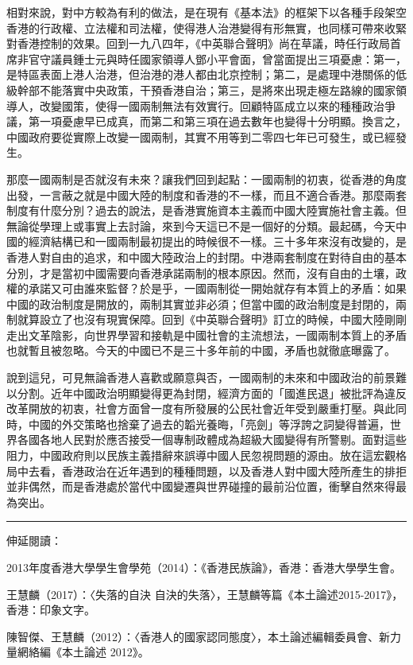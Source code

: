 相對來說，對中方較為有利的做法，是在現有《基本法》的框架下以各種手段架空香港的行政權、立法權和司法權，使得港人治港變得有形無實，也同樣可帶來收緊對香港控制的效果。回到一九八四年，《中英聯合聲明》尚在草議，時任行政局首席非官守議員鍾士元與時任國家領導人鄧小平會面，曾當面提出三項憂慮：第一，是特區表面上港人治港，但治港的港人都由北京控制；第二，是處理中港關係的低級幹部不能落實中央政策，干預香港自治；第三，是將來出現走極左路線的國家領導人，改變國策，使得一國兩制無法有效實行。回顧特區成立以來的種種政治爭議，第一項憂慮早已成真，而第二和第三項在過去數年也變得十分明顯。換言之，中國政府要從實際上改變一國兩制，其實不用等到二零四七年已可發生，或已經發生。

那麼一國兩制是否就沒有未來？讓我們回到起點：一國兩制的初衷，從香港的角度出發，一言蔽之就是中國大陸的制度和香港的不一樣，而且不適合香港。那麼兩套制度有什麼分別？過去的說法，是香港實施資本主義而中國大陸實施社會主義。但無論從學理上或事實上去討論，來到今天這已不是一個好的分類。最起碼，今天中國的經濟結構已和一國兩制最初提出的時候很不一樣。三十多年來沒有改變的，是香港人對自由的追求，和中國大陸政治上的封閉。中港兩套制度在對待自由的基本分別，才是當初中國需要向香港承諾兩制的根本原因。然而，沒有自由的土壤，政權的承諾又可由誰來監督？於是乎，一國兩制從一開始就存有本質上的矛盾：如果中國的政治制度是開放的，兩制其實並非必須；但當中國的政治制度是封閉的，兩制就算設立了也沒有現實保障。回到《中英聯合聲明》訂立的時候，中國大陸剛剛走出文革陰影，向世界學習和接軌是中國社會的主流想法，一國兩制本質上的矛盾也就暫且被忽略。今天的中國已不是三十多年前的中國，矛盾也就徹底曝露了。

說到這兒，可見無論香港人喜歡或願意與否，一國兩制的未來和中國政治的前景難以分割。近年中國政治明顯變得更為封閉，經濟方面的「國進民退」被批評為違反改革開放的初衷，社會方面曾一度有所發展的公民社會近年受到嚴重打壓。與此同時，中國的外交策略也捨棄了過去的韜光養晦，「亮劍」等浮誇之詞變得普遍，世界各國各地人民對於應否接受一個專制政體成為超級大國變得有所警剔。面對這些阻力，中國政府則以民族主義措辭來誤導中國人民忽視問題的源由。放在這宏觀格局中去看，香港政治在近年遇到的種種問題，以及香港人對中國大陸所產生的排拒並非偶然，而是香港處於當代中國變遷與世界碰撞的最前沿位置，衝擊自然來得最為突出。

\rule[-10pt]{15cm}{0.05em}

伸延閱讀：

2013年度香港大學學生會學苑（2014）：《香港民族論》，香港：香港大學學生會。

王慧麟（2017）：〈失落的自決 自決的失落〉，王慧麟等篇《本土論述2015-2017》，香港：印象文字。

陳智傑、王慧麟（2012）：〈香港人的國家認同態度〉，本土論述編輯委員會、新力量網絡編《本土論述 2012》。